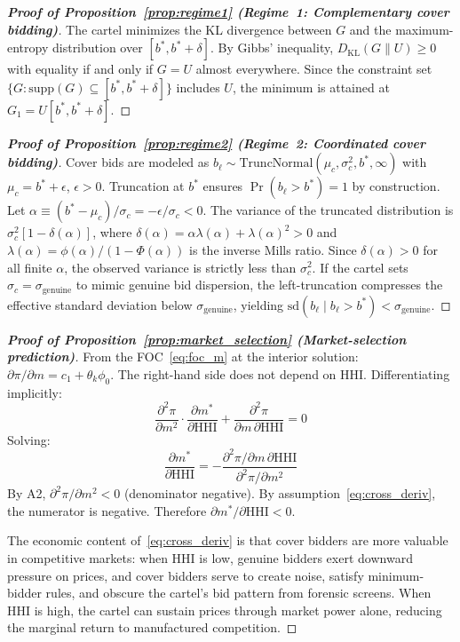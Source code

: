 \begin{proof}[\textbf{Proof of Proposition~\ref{prop:regime1} (Regime~1: Complementary cover bidding)}]
The cartel minimizes the KL divergence between $G$ and the maximum-entropy
distribution over $[b^*, b^* + \delta]$. By Gibbs' inequality,
$D_{\text{KL}}(G \| U) \geq 0$ with equality if and only if $G = U$
almost everywhere. Since the constraint set
$\{G : \text{supp}(G) \subseteq [b^*, b^* + \delta]\}$ includes $U$,
the minimum is attained at $G_1 = U[b^*, b^* + \delta]$.
\end{proof}

\begin{proof}[\textbf{Proof of Proposition~\ref{prop:regime2} (Regime~2: Coordinated cover bidding)}]
Cover bids are modeled as $b_\ell \sim
\text{TruncNormal}(\mu_c, \sigma_c^2, b^*, \infty)$ with
$\mu_c = b^* + \epsilon$, $\epsilon > 0$. Truncation at $b^*$
ensures $\Pr(b_\ell > b^*) = 1$ by construction. Let
$\alpha \equiv (b^* - \mu_c)/\sigma_c = -\epsilon/\sigma_c < 0$.
The variance of the truncated distribution is
$\sigma_c^2[1 - \delta(\alpha)]$, where
$\delta(\alpha) = \alpha\lambda(\alpha) + \lambda(\alpha)^2 > 0$
and $\lambda(\alpha) = \phi(\alpha)/(1 - \Phi(\alpha))$ is the
inverse Mills ratio. Since $\delta(\alpha) > 0$ for all finite
$\alpha$, the observed variance is strictly less than $\sigma_c^2$.
If the cartel sets $\sigma_c = \sigma_{\text{genuine}}$ to mimic
genuine bid dispersion, the left-truncation compresses the effective
standard deviation below $\sigma_{\text{genuine}}$, yielding
$\text{sd}(b_\ell \mid b_\ell > b^*) < \sigma_{\text{genuine}}$.
\end{proof}

\begin{proof}[\textbf{Proof of Proposition~\ref{prop:market_selection} (Market-selection prediction)}]
From the FOC~\eqref{eq:foc_m} at the interior solution:
$\partial \pi / \partial m = c_1 + \theta_k \phi_0$. The right-hand
side does not depend on HHI. Differentiating implicitly:
\[
  \frac{\partial^2 \pi}{\partial m^2} \cdot
  \frac{\partial m^*}{\partial \text{HHI}}
  + \frac{\partial^2 \pi}{\partial m \, \partial \text{HHI}} = 0
\]
Solving:
\[
  \frac{\partial m^*}{\partial \text{HHI}} =
  -\frac{\partial^2 \pi / \partial m \, \partial \text{HHI}}
  {\partial^2 \pi / \partial m^2}
\]
By A2, $\partial^2 \pi / \partial m^2 < 0$ (denominator negative).
By assumption~\eqref{eq:cross_deriv}, the numerator is negative.
Therefore $\partial m^* / \partial \text{HHI} < 0$.

The economic content of~\eqref{eq:cross_deriv} is that cover bidders
are more valuable in competitive markets: when HHI is low, genuine
bidders exert downward pressure on prices, and cover bidders serve to
create noise, satisfy minimum-bidder rules, and obscure the cartel's
bid pattern from forensic screens. When HHI is high, the cartel can
sustain prices through market power alone, reducing the marginal return
to manufactured competition.
\end{proof}

